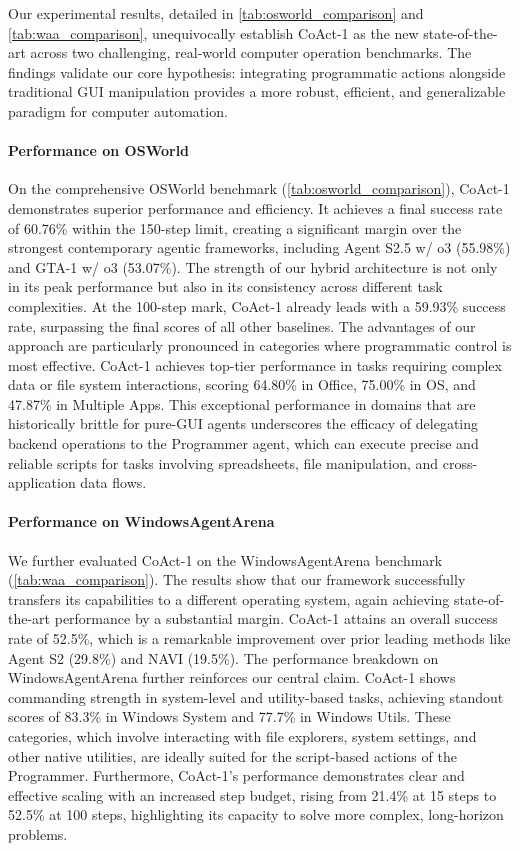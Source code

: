 \documentclass{article} %
\newcommand{\ours}{CoAct-1\xspace}
\begin{document}
Our experimental results, detailed in \autoref{tab:osworld_comparison} and \autoref{tab:waa_comparison}, unequivocally establish \ours as the new state-of-the-art across two challenging, real-world computer operation benchmarks. The findings validate our core hypothesis: integrating programmatic actions alongside traditional GUI manipulation provides a more robust, efficient, and generalizable paradigm for computer automation.

\paragraph{Performance on OSWorld}
On the comprehensive OSWorld benchmark (\autoref{tab:osworld_comparison}), \ours demonstrates superior performance and efficiency. It achieves a final success rate of 60.76\% within the 150-step limit, creating a significant margin over the strongest contemporary agentic frameworks, including Agent S2.5 w/ o3 (55.98\%) and GTA-1 w/ o3 (53.07\%). The strength of our hybrid architecture is not only in its peak performance but also in its consistency across different task complexities. At the 100-step mark, \ours already leads with a 59.93\% success rate, surpassing the final scores of all other baselines. 
The advantages of our approach are particularly pronounced in categories where programmatic control is most effective. \ours achieves top-tier performance in tasks requiring complex data or file system interactions, scoring 64.80\% in Office, 75.00\% in OS, and 47.87\% in Multiple Apps.  This exceptional performance in domains that are historically brittle for pure-GUI agents underscores the efficacy of delegating backend operations to the Programmer agent, which can execute precise and reliable scripts for tasks involving spreadsheets, file manipulation, and cross-application data flows.

\paragraph{Performance on WindowsAgentArena} We further evaluated \ours on the WindowsAgentArena benchmark (\autoref{tab:waa_comparison}). The results show that our framework successfully transfers its capabilities to a different operating system, again achieving state-of-the-art performance by a substantial margin. \ours attains an overall success rate of 52.5\%, which is a remarkable improvement over prior leading methods like Agent S2 (29.8\%) and NAVI (19.5\%). The performance breakdown on WindowsAgentArena further reinforces our central claim. \ours shows commanding strength in system-level and utility-based tasks, achieving standout scores of 83.3\% in Windows System and 77.7\% in Windows Utils. These categories, which involve interacting with file explorers, system settings, and other native utilities, are ideally suited for the script-based actions of the Programmer. Furthermore, \ours's performance demonstrates clear and effective scaling with an increased step budget, rising from 21.4\% at 15 steps to 52.5\% at 100 steps, highlighting its capacity to solve more complex, long-horizon problems. 
\end{document}
